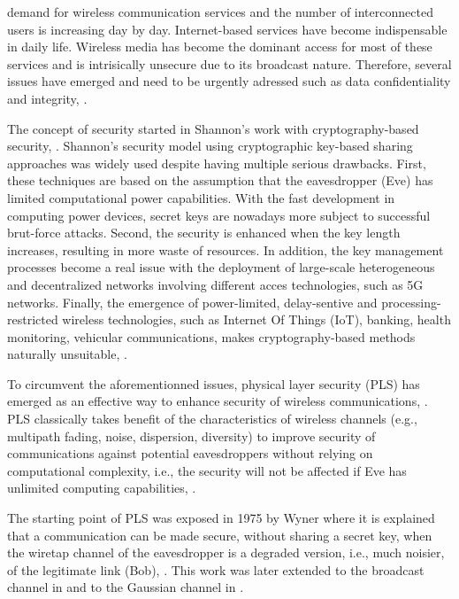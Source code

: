 \documentclass[journal,comsoc]{IEEEtran}
\begin{document}
 demand for wireless communication services and the number of interconnected users is increasing day by day. Internet-based services have become indispensable in daily life. Wireless media has become the dominant access for most of these services and is intrisically unsecure due to its broadcast nature. Therefore, several issues have emerged and need to be urgently adressed such as data confidentiality and integrity, \cite{8509094,8543573}.

The concept of security started in Shannon's work with cryptography-based security, \cite{6769090}. Shannon's security model using cryptographic key-based sharing approaches was widely used despite having multiple serious drawbacks. First, these techniques are based on the assumption that the eavesdropper (Eve) has limited computational power capabilities. With the fast development in computing power devices, secret keys are nowadays more subject to successful brut-force attacks. Second, the security is enhanced when the key length increases, resulting in more waste of resources. In addition, the key management processes become a real issue with the deployment of large-scale heterogeneous and decentralized networks involving different acces technologies, such as 5G networks. Finally, the emergence of power-limited, delay-sentive and processing-restricted wireless technologies, such as Internet Of Things (IoT), banking, health monitoring, vehicular communications, makes cryptography-based methods naturally unsuitable, \cite{8509094}.

To circumvent the aforementionned issues, physical layer security (PLS) has emerged as an effective way to enhance security of wireless communications, \cite{alves2012performance,yang2012physical,tran2015secrecy,8353879}. PLS classically takes benefit of the characteristics of wireless channels (e.g., multipath fading, noise, dispersion, diversity) to improve security of communications against potential eavesdroppers without relying on computational complexity, i.e., the security will not be affected if Eve has unlimited computing capabilities, \cite{9049811,snchez2020survey}. 

The starting point of PLS was exposed in 1975 by Wyner where it is explained that a communication can be made secure, without sharing a secret key, when the wiretap channel of the eavesdropper is a degraded version, i.e., much noisier, of the legitimate link (Bob), \cite{6772207}. This work was later extended to the broadcast channel in \cite{1055892} and to the Gaussian channel in \cite{1055917}. 
\end{document}
